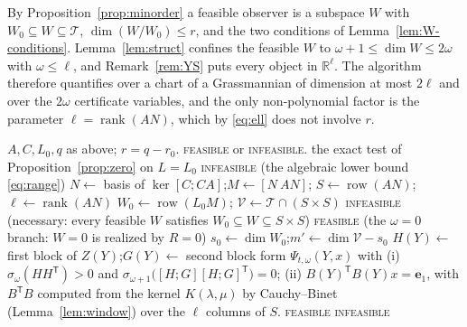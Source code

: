 \documentclass[journal]{IEEEtran}
\theoremstyle{plainn}
\theoremstyle{remark}
\begin{document}
By Proposition~\ref{prop:minorder} a feasible observer is a subspace $W$ with
$W_0\subseteq W\subseteq\mathcal T$, $\dim(W/W_0)\le r$, and the two conditions of
Lemma~\ref{lem:W-conditions}. Lemma~\ref{lem:struct} confines the feasible $W$ to
$\omega+1\le\dim W\le2\omega$ with $\omega\le\ell$, and Remark~\ref{rem:YS} puts every object in
$\mathbb R^\ell$. The algorithm therefore quantifies over a chart of a Grassmannian of dimension
at most $2\ell$ and over the $2\omega$ certificate variables, and the only non-polynomial factor
is the parameter $\ell=\operatorname{rank}(AN)$, which by \eqref{eq:ell} does not involve $r$.

\begin{algorithm}[!t]
\caption{Deciding $\mathrm{DEC}(q)$ in time $f(\ell)\operatorname{poly}(\mathcal L)$}
\label{alg:fpt}
\begin{algorithmic}[1]
\Require $A,C,L_0,q$ as above; $r=q-r_0$.
\Ensure \textsc{feasible} or \textsc{infeasible}.
  \State \Return the exact test of Proposition~\ref{prop:zero} on $L=L_0$
\EndIf
{}
  \State \Return \textsc{infeasible}
  \Statex \quad \textup{(the algebraic lower bound \eqref{eq:range})}
\EndIf
\State $N\gets$ basis of $\ker[C;CA]$;\quad $M\gets[N\ AN]$;\quad
$S\gets\operatorname{row}(AN)$;\quad $\ell\gets\operatorname{rank}(AN)$
\State $W_0\gets\operatorname{row}(L_0M)$;\quad
$\mathcal V\gets\mathcal T\cap(S\times S)$
  \State \Return \textsc{infeasible}
  \Statex \quad \textup{(necessary: every feasible $W$ satisfies $W_0\subseteq W\subseteq S\times S$)}
\EndIf
{}
  \State \Return \textsc{feasible}
  \Statex \quad \textup{(the $\omega=0$ branch: $W=0$ is realized by $R=0$)}
\EndIf
\State $s_0\gets\dim W_0$;\quad $m'\gets\dim\mathcal V-s_0$
    \State $H(Y)\gets$ first block of $Z(Y)$;\quad $G(Y)\gets$ second block
      \State form $\Psi_{t,\omega}(Y,x)$ with
      \Statex \quad (i) $\sigma_\omega(HH^{\mathsf T})>0$ and
               $\sigma_{\omega+1}\bigl([H;G][H;G]^{\mathsf T}\bigr)=0$;
      \Statex \quad (ii) $B(Y)^{\mathsf T}B(Y)x=\mathbf e_1$, with $B^{\mathsf T}B$ computed
               from the kernel $K(\lambda,\mu)$ by Cauchy--Binet (Lemma~\ref{lem:window}) over the
               $\ell$ columns of $S$.
        \State \Return \textsc{feasible}
      \EndIf
    \EndFor
  \EndFor
\EndFor
\State \Return \textsc{infeasible}
\end{algorithmic}
\end{algorithm}
\end{document}
